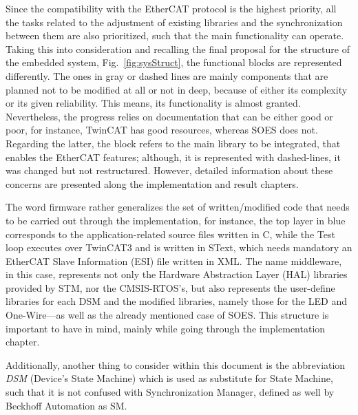 Since the compatibility with the EtherCAT protocol is the highest priority, all the tasks related to the adjustment of existing libraries and 
the synchronization between them are also prioritized, such that the main functionality can operate. Taking this into consideration and 
recalling the final proposal for the structure of the embedded system, Fig.~\ref{fig:sysStruct}, the functional blocks are represented differently. 
The ones in gray or dashed lines are mainly components that are planned not to be modified
at all or not in deep, because of either its complexity or its given reliability. This means, its functionality is almost granted. 
Nevertheless, the progress relies on documentation that can be either good or poor, for instance, TwinCAT has good resources, 
whereas SOES does not. Regarding the latter, the block refers to the main library to be integrated, that enables the EtherCAT features; 
although, 
it is represented with dashed-lines, it was changed but not restructured.
However, detailed information about these concerns are presented along the implementation and result chapters.

The word firmware rather generalizes the set of written/modified code that needs to be carried out through the implementation, for instance, the
top layer in blue corresponds to the application-related source files written in C, while the Test loop executes over TwinCAT3 and is written
in SText, which needs mandatory an EtherCAT Slave Information (ESI) file written in XML. The name middleware, in this case, represents not 
only the Hardware Abstraction Layer (HAL) libraries provided by STM, nor the CMSIS-RTOS's, but also represents the user-define libraries for each
DSM and the modified libraries, namely those for the LED and One-Wire---as well as the already mentioned case of SOES. This structure is important to have
in mind, mainly while going through the implementation chapter.

Additionally, another thing to consider within this document is the abbreviation \emph{DSM} (Device's State Machine) which is used as substitute for State Machine,
such that it is not confused with Synchronization Manager, defined as well by Beckhoff Automation as SM.



